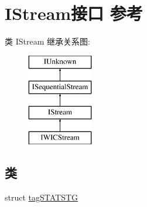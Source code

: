 \hypertarget{interface_i_stream}{}\section{I\+Stream接口 参考}
\label{interface_i_stream}
类 I\+Stream 继承关系图\+:\begin{figure}[H]
\begin{center}
\leavevmode
\includegraphics[height=4.000000cm]{interface_i_stream}
\end{center}
\end{figure}
\subsection*{类}
\begin{DoxyCompactItemize}
\item 
struct \hyperlink{struct_i_stream_1_1tag_s_t_a_t_s_t_g}{tag\+S\+T\+A\+T\+S\+TG}
\end{DoxyCompactItemize}
